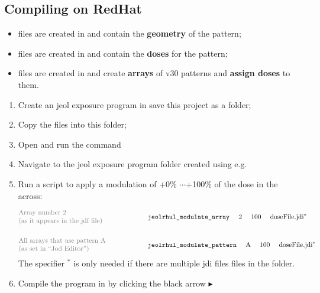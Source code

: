 \subsection{Compiling on RedHat}
\begin{center}
  \begin{itemize}
  \item { files are created  in  and contain the
      \textbf{geometry} of the pattern;}
  \item { files are created  in  and contain the
      \textbf{doses} for the pattern;}
  \item { files  are created in  and create
      \textbf{arrays} of  v30 patterns  and \textbf{assign  doses} to
      them.}
  \end{itemize}
\end{center}
\vspace{1cm}
\begin{enumerate}
\item Create  an jeol  exposure program in  
  \ira {} save this  project as a
  folder;
\item Copy the  files into this folder;
\item Open  and run the command
  \begin{center}
  \end{center}
\item  Navigate to  the jeol  exposure program  folder created  using
   e.g.
  \begin{center}
  \end{center}
\item Run a  script to apply a modulation of  +0\% $ \cdots$+100\% of
  the dose in the  across:

  \begin{framed}\noindent
    \[
      \begin{aligned}
        \parbox{6cm}{\color{gray} Array number 2 \newline(as it appears in the jdf file)}& \quad  & &\text{\cmd{jeolrhul\_modulate\_array} \quad 2 \quad 100 \quad doseFile.jdi}^{*}\\\\
        \parbox{6cm}{\color{gray} All arrays that use pattern A \newline (as set in \quote{Jod Editor})}& & &\text{\cmd{jeolrhul\_modulate\_pattern} \quad A \quad 100 \quad doseFile.jdi}^{*}\\
      \end{aligned}
    \]
    \hfill  The specifier  $  ^{*}  $ is  only  needed  if there  are
    multiple jdi files files in the folder.
  \end{framed}

\item Compile  the program  in   by clicking
  the black arrow $ \blacktriangleright $\newline  {}
\end{enumerate}

\newpage
